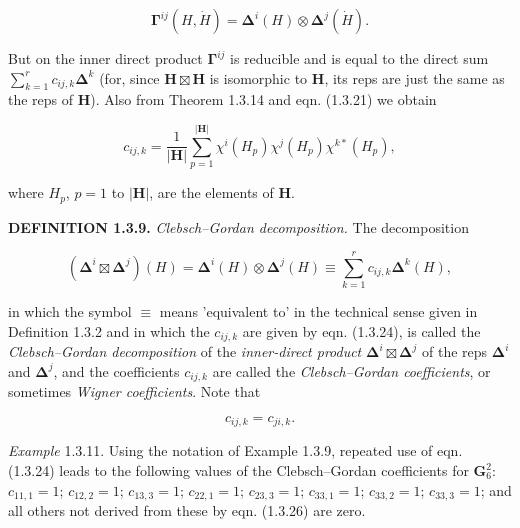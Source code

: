 \documentclass[11pt,a4paper,twoside,openright]{book}
\begin{document}
\begin{equation*}
\boldsymbol{\Gamma}^{ij}(H, \dot{H}) = \boldsymbol{\Delta}^{i}(H) \otimes \boldsymbol{\Delta}^{j}(\dot{H}). \tag{1.3.23}
\end{equation*}

But on the inner direct product $\boldsymbol{\Gamma}^{ij}$ is reducible and is equal to the direct sum $\sum_{k=1}^{r} c_{ij,k}\boldsymbol{\Delta}^{k}$ (for, since $\mathbf{H} \boxtimes \mathbf{H}$ is isomorphic to $\mathbf{H}$, its reps are just the same as the reps of $\mathbf{H}$). Also from Theorem 1.3.14 and eqn. (1.3.21) we obtain

\begin{equation*}
c_{ij,k} = \frac{1}{|\mathbf{H}|}\sum_{p=1}^{|\mathbf{H}|} \chi^{i}(H_{p})\chi^{j}(H_{p})\chi^{k*}(H_{p}), \tag{1.3.24}
\end{equation*}

where $H_{p}$, $p = 1$ to $|\mathbf{H}|$, are the elements of $\mathbf{H}$.

\textbf{DEFINITION 1.3.9.} \textit{Clebsch–Gordan decomposition.} The decomposition

\begin{equation*}
(\boldsymbol{\Delta}^{i} \boxtimes \boldsymbol{\Delta}^{j})(H) = \boldsymbol{\Delta}^{i}(H) \otimes \boldsymbol{\Delta}^{j}(H) \equiv \sum_{k=1}^{r} c_{ij,k}\boldsymbol{\Delta}^{k}(H), \tag{1.3.25}
\end{equation*}

in which the symbol $\equiv$ means 'equivalent to' in the technical sense given in Definition 1.3.2 and in which the $c_{ij,k}$ are given by eqn. (1.3.24), is called the \textit{Clebsch–Gordan decomposition} of the \textit{inner-direct product} $\boldsymbol{\Delta}^{i} \boxtimes \boldsymbol{\Delta}^{j}$ of the reps $\boldsymbol{\Delta}^{i}$ and $\boldsymbol{\Delta}^{j}$, and the coefficients $c_{ij,k}$ are called the \textit{Clebsch–Gordan coefficients}, or sometimes \textit{Wigner coefficients}. Note that

\begin{equation*}
c_{ij,k} = c_{ji,k}. \tag{1.3.26}
\end{equation*}

\textit{Example} 1.3.11. Using the notation of Example 1.3.9, repeated use of eqn. (1.3.24) leads to the following values of the Clebsch–Gordan coefficients for $\mathbf{G}_6^2$: $c_{11,1} = 1$; $c_{12,2} = 1$; $c_{13,3} = 1$; $c_{22,1} = 1$; $c_{23,3} = 1$; $c_{33,1} = 1$; $c_{33,2} = 1$; $c_{33,3} = 1$; and all others not derived from these by eqn. (1.3.26) are zero.
\end{document}

